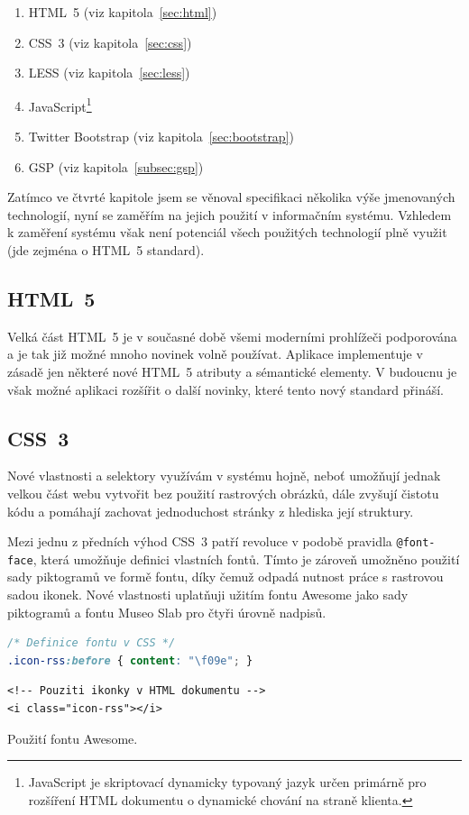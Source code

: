 \begin{enumerate}
    \item HTML~5 (viz kapitola~\ref{sec:html})
    \item CSS~3 (viz kapitola~\ref{sec:css})
    \item LESS (viz kapitola~\ref{sec:less})
    \item JavaScript\footnote{JavaScript je skriptovací dynamicky typovaný jazyk určen primárně pro rozšíření HTML dokumentu o dynamické chování na straně klienta.}
    \item Twitter Bootstrap (viz kapitola~\ref{sec:bootstrap})
    \item GSP (viz kapitola~\ref{subsec:gsp})
\end{enumerate}

Zatímco ve čtvrté kapitole jsem se věnoval specifikaci několika výše jmenovaných technologií, nyní se zaměřím na jejich použití v informačním systému. Vzhledem k zaměření systému však není potenciál všech použitých technologií plně využit (jde zejména o HTML~5 standard).

\subsection{HTML~5}

Velká část HTML~5 je v současné době všemi moderními prohlížeči podporována a je tak již možné mnoho novinek volně používat. Aplikace implementuje v zásadě jen některé nové HTML~5 atributy a sémantické elementy. V budoucnu je však možné aplikaci rozšířit o další novinky, které tento nový standard přináší.

\subsection{CSS~3}

Nové vlastnosti a selektory využívám v systému hojně, neboť umožňují jednak velkou část webu vytvořit bez použití rastrových obrázků, dále zvyšují čistotu kódu a pomáhají zachovat jednoduchost stránky z hlediska její struktury.

Mezi jednu z předních výhod CSS~3 patří revoluce v podobě pravidla \texttt{@font-face}, která umožňuje definici vlastních fontů. Tímto je zároveň umožněno použití sady piktogramů ve formě fontu, díky čemuž odpadá nutnost práce s rastrovou sadou ikonek. Nové vlastnosti uplatňuji užitím fontu Awesome jako sady piktogramů a fontu Museo Slab pro čtyři úrovně nadpisů.

\begin{demo}
    \centering
    \begin{lstlisting}[language=css]
/* Definice fontu v CSS */
.icon-rss:before { content: "\f09e"; }
    \end{lstlisting}
    \begin{lstlisting}[language=html5]
<!-- Pouziti ikonky v HTML dokumentu -->
<i class="icon-rss"></i>
    \end{lstlisting}
    \caption{Použití fontu Awesome.}
    \label{demo:awesome}
\end{demo}


